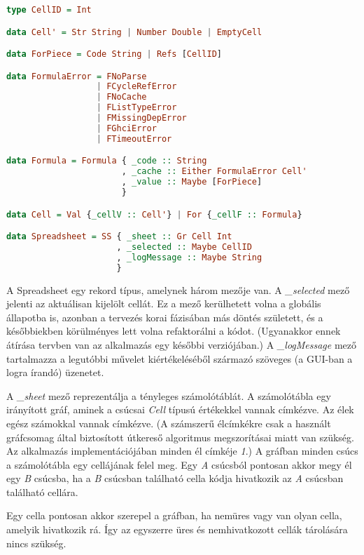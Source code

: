 \begin{lstlisting}[language={Haskell}]
type CellID = Int

data Cell' = Str String | Number Double | EmptyCell

data ForPiece = Code String | Refs [CellID]

data FormulaError = FNoParse
                  | FCycleRefError
                  | FNoCache
                  | FListTypeError
                  | FMissingDepError
                  | FGhciError
                  | FTimeoutError

data Formula = Formula { _code :: String
                       , _cache :: Either FormulaError Cell'
                       , _value :: Maybe [ForPiece]
                       }

data Cell = Val {_cellV :: Cell'} | For {_cellF :: Formula}

data Spreadsheet = SS { _sheet :: Gr Cell Int
                      , _selected :: Maybe CellID
                      , _logMessage :: Maybe String
                      }
\end{lstlisting}

A Spreadsheet egy rekord típus, amelynek három mezője van. A \textit{\_selected} mező jelenti az aktuálisan kijelölt cellát. Ez a mező kerülhetett volna a globális állapotba is, azonban a tervezés korai fázisában más döntés született, és a későbbiekben körülményes lett volna refaktorálni a kódot. (Ugyanakkor ennek átírása tervben van az alkalmazás egy későbbi verziójában.) A \textit{\_logMessage} mező tartalmazza a legutóbbi művelet kiértékeléséből származó szöveges (a GUI-ban a logra írandó) üzenetet.

A \textit{\_sheet} mező reprezentálja a tényleges számolótáblát. A számolótábla egy irányított gráf, aminek a csúcsai \textit{Cell} típusú értékekkel vannak címkézve. Az élek egész számokkal vannak címkézve. (A számszerű élcímkékre csak a használt gráfcsomag által biztosított útkereső algoritmus megszorításai miatt van szükség. Az alkalmazás implementációjában minden él címkéje \textit{1}.) A gráfban minden csúcs a számolótábla egy cellájának felel meg. Egy \textit{A} csúcsból pontosan akkor megy él egy \textit{B} csúcsba, ha a \textit{B} csúcsban található cella kódja hivatkozik az \textit{A} csúcsban található cellára. 

Egy cella pontosan akkor szerepel a gráfban, ha nemüres vagy van olyan cella, amelyik hivatkozik rá. Így az egyszerre üres és nemhivatkozott cellák tárolására nincs szükség.

